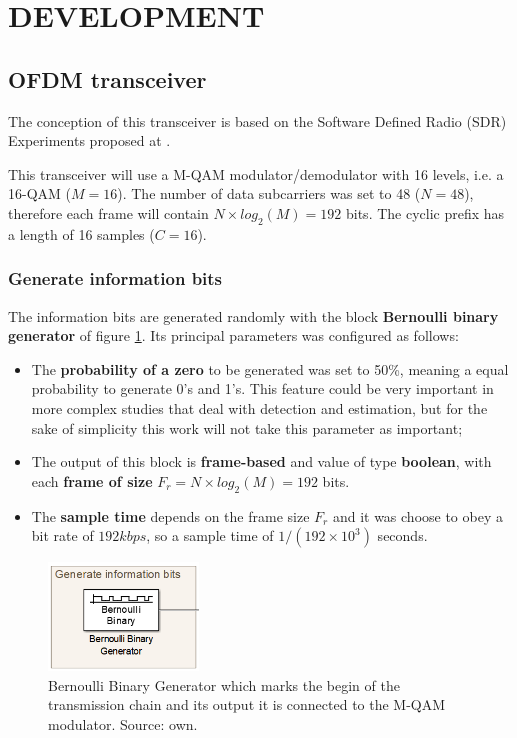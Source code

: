 \section{DEVELOPMENT}

\subsection{OFDM transceiver}

The conception of this transceiver is based on the Software Defined Radio (SDR) Experiments proposed at \cite{ece489}.

This transceiver will use a M-QAM modulator/demodulator with 16 levels, i.e. a 16-QAM ($M=16$). The number of data subcarriers was set to 48 ($N=48$), therefore each frame will contain $N\times log_2(M) = 192$ bits. The cyclic prefix has a length of 16 samples ($C=16$).

\subsubsection{Generate information bits}

The information bits are generated randomly with the block \textbf{Bernoulli binary generator} of figure \ref{fig:block1}. Its principal parameters was configured as follows:

\begin{itemize}
    \item The \textbf{probability of a zero} to be generated was set to 50\%, meaning a equal probability to generate 0's and 1's. This feature could be very important in more complex studies that deal with detection and estimation, but for the sake of simplicity this work will not take this parameter as important; 
    \item The output of this block is \textbf{frame-based} and value of type \textbf{boolean}, with each \textbf{frame of size} $F_r = N\times log_2(M) = 192$ bits.
    \item The \textbf{sample time} depends on the frame size $F_r$ and it was choose to obey a bit rate of $192 kbps$, so a sample time of $1/(192\times 10^3)$ seconds.
\end{itemize}

\begin{figure}[h]
\begin{center}
\includegraphics[width=4cm]{images/block1.png}
\caption{Bernoulli Binary Generator which marks the begin of the transmission chain and its output it is connected to the M-QAM modulator. Source: own.}
\label{fig:block1} 
\end{center}
\end{figure}

